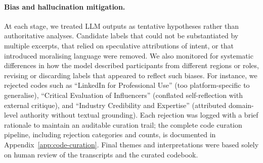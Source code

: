 \paragraph{Bias and hallucination mitigation.}
At each stage, we treated LLM outputs as tentative hypotheses rather than authoritative analyses. Candidate labels that could not be substantiated by multiple excerpts, that relied on speculative attributions of intent, or that introduced moralising language were removed. We also monitored for systematic differences in how the model described participants from different regions or roles, revising or discarding labels that appeared to reflect such biases. For instance, we rejected codes such as ``LinkedIn for Professional Use'' (too platform-specific to generalise), ``Critical Evaluation of Influencers'' (conflated self-reflection with external critique), and ``Industry Credibility and Expertise'' (attributed domain-level authority without textual grounding). Each rejection was logged with a brief rationale to maintain an auditable curation trail; the complete code curation pipeline, including rejection categories and counts, is documented in Appendix~\ref{app:code-curation}. Final themes and interpretations were based solely on human review of the transcripts and the curated codebook.
%






